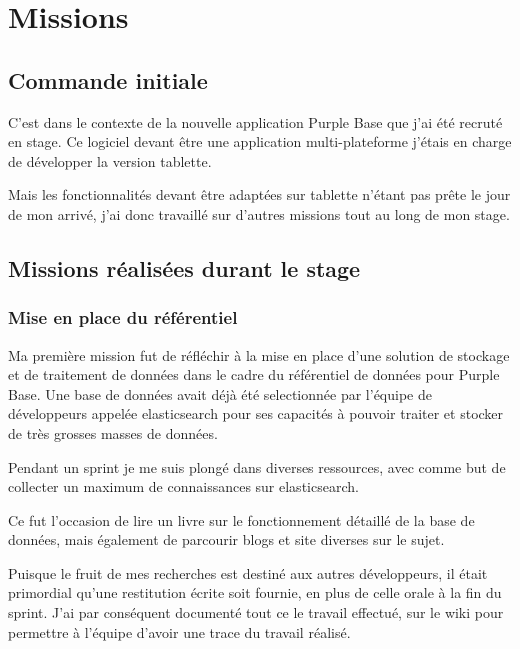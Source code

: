 
\chapter{Missions}

\section{Commande initiale}

C'est dans le contexte de la nouvelle application Purple Base que j'ai été recruté en stage. 
Ce logiciel devant être une application multi-plateforme j'étais en charge de développer la version tablette. 

Mais les fonctionnalités devant être adaptées sur tablette n'étant pas prête le jour de mon arrivé, j'ai donc travaillé sur d'autres missions tout au long de mon stage. 


\section{Missions réalisées durant le stage}

\subsection{Mise en place du référentiel}

Ma première mission fut de réfléchir à la mise en place d'une solution de stockage et de traitement de données dans le cadre du référentiel de données pour Purple Base. 
Une base de données avait déjà été selectionnée par l'équipe de développeurs appelée \gls{elasticsearch} 
pour ses capacités à pouvoir traiter et stocker de très grosses masses de données. 

Pendant un \gls{sprint} je me suis plongé dans diverses ressources, avec comme but de collecter un maximum de connaissances sur \gls{elasticsearch}. 

Ce fut l'occasion de lire un livre sur le fonctionnement détaillé de la base de données, mais également de parcourir blogs et site diverses sur le sujet.

Puisque le fruit de mes recherches est destiné aux autres développeurs, il était primordial qu'une restitution écrite soit fournie, en plus de celle orale à la fin du sprint.
J'ai par conséquent documenté tout ce le travail effectué, sur le \gls{wiki} pour permettre à l'équipe d'avoir une trace du travail réalisé.

